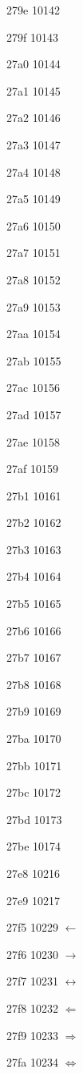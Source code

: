 \documentclass[11pt]{article}
\begin{document}
279e 10142 

279f 10143 

27a0 10144 

27a1 10145 

27a2 10146 

27a3 10147 

27a4 10148 

27a5 10149 

27a6 10150 

27a7 10151 

27a8 10152 

27a9 10153 

27aa 10154 

27ab 10155 

27ac 10156 

27ad 10157 

27ae 10158 

27af 10159 

27b1 10161 

27b2 10162 

27b3 10163 

27b4 10164 

27b5 10165 

27b6 10166 

27b7 10167 

27b8 10168 

27b9 10169 

27ba 10170 

27bb 10171 

27bc 10172 

27bd 10173 

27be 10174 

27e8 10216 \langle

27e9 10217 \rangle

27f5 10229 \ensuremath{\longleftarrow}

27f6 10230 \ensuremath{\longrightarrow}

27f7 10231 \ensuremath{\longleftrightarrow}

27f8 10232 \ensuremath{\Longleftarrow}

27f9 10233 \ensuremath{\Longrightarrow}

27fa 10234 \ensuremath{\Longleftrightarrow}
\end{document}
